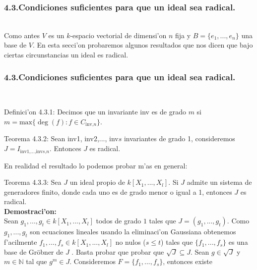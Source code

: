 \documentclass[10pt]{beamer}
\renewcommand{\N}{\mathbb{N}}
\begin{document}
\begin{frame}
\frametitle{4.3.Condiciones suficientes para que un ideal sea radical.}\\
Como antes $V$ es un $k$-espacio vectorial de dimensi'on $n$ fija y $B=\{e_1,...,e_n\}$ una base de $V$. En esta secci'on probaremos algunos resultados que nos dicen que bajo ciertas circunstancias un ideal es radical. \\
\end{frame}



\begin{frame}
\frametitle{4.3.Condiciones suficientes para que un ideal sea radical.}\\
\begin{block}{Definici'on 4.3.1:}
Decimos que un invariante inv es de grado $m$ si $m= \text{max}\{\deg(f):f \in C_{\text{inv,}n}\}$.\\
\end{block}
\begin{block}{Teorema 4.3.2:}
Sean inv1, inv2,..., inv$s$ invariantes de grado 1, consideremos $J=I_{\text{inv1,...,inv}s\text{,}n}$. Entonces $J$ es radical.\\
\end{block}
En realidad el resultado lo podemos probar m'as en general:\\
\begin{block}{Teorema 4.3.3:}
Sea $J$ un ideal propio de $k[X_1,...,X_l]$. Si $J$ admite un sistema de generadores finito, donde cada uno es de grado menor o igual a 1, entonces $J$ es radical.\\
\textbf{Demostraci'on:}\\
Sean $g_1,...,g_t \in k[X_1,...,X_l]$ todos de grado $1$ tales que $J=(g_1,...,g_t)$. Como $g_1,...,g_t$ son ecuaciones lineales usando la eliminaci'on Gaussiana obtenemos f'acilmente $f_1,...,f_s \in k[X_1,...,X_l]$ no nulos ($s \leq t$) tales que $\{f_1,...,f_s\}$ es una base de Gr\"obner de $J$ . Basta probar que probar que $\sqrt{J}\subseteq J$. Sean $g \in \sqrt{J}$ y $m \in \N$ tal que $g^m \in J$. Consideremos $F=\{f_1,...,f_s\}$, entonces existe
\end{block}
\end{frame}
\end{document}
